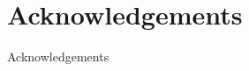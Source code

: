 \documentclass{standalone}
\begin{document}
	\section{Acknowledgements}
		Acknowledgements 
\end{document}
